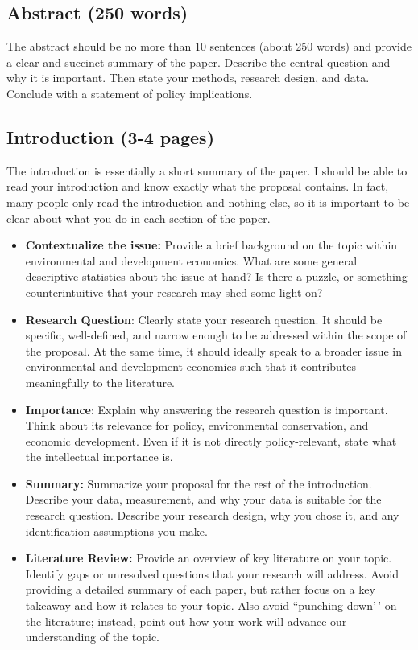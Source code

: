 \documentclass[
]{article}
\begin{document}
\hypertarget{abstract-250-words}{%
\subsection{Abstract (250 words)}\label{abstract-250-words}}

The abstract should be no more than 10 sentences (about 250 words) and provide a clear and succinct summary of the paper. Describe the central question and why it is important. Then state your methods, research design, and data. Conclude with a statement of policy implications.

\hypertarget{introduction-3-4-pages}{%
\subsection{Introduction (3-4 pages)}\label{introduction-3-4-pages}}

The introduction is essentially a short summary of the paper. I should be able to read your introduction and know exactly what the proposal contains. In fact, many people only read the introduction and nothing else, so it is important to be clear about what you do in each section of the paper.

\begin{itemize}
\item
  \textbf{Contextualize the issue:} Provide a brief background on the topic within environmental and development economics. What are some general descriptive statistics about the issue at hand? Is there a puzzle, or something counterintuitive that your research may shed some light on?
\item
  \textbf{Research Question}: Clearly state your research question. It should be specific, well-defined, and narrow enough to be addressed within the scope of the proposal. At the same time, it should ideally speak to a broader issue in environmental and development economics such that it contributes meaningfully to the literature.
\item
  \textbf{Importance}: Explain why answering the research question is important. Think about its relevance for policy, environmental conservation, and economic development. Even if it is not directly policy-relevant, state what the intellectual importance is.
\item
  \textbf{Summary:} Summarize your proposal for the rest of the introduction. Describe your data, measurement, and why your data is suitable for the research question. Describe your research design, why you chose it, and any identification assumptions you make.
\item
  \textbf{Literature Review:} Provide an overview of key literature on your topic. Identify gaps or unresolved questions that your research will address. Avoid providing a detailed summary of each paper, but rather focus on a key takeaway and how it relates to your topic. Also avoid ``punching down'\,' on the literature; instead, point out how your work will advance our understanding of the topic.
\end{itemize}
\end{document}
